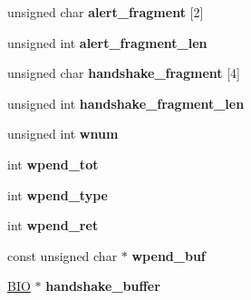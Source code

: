 \begin{DoxyCompactItemize}
\item 
\hypertarget{structssl3__state__st_ac5746677681e98a0ca4e3fb0551dd1df}{}unsigned char {\bfseries alert\+\_\+fragment} \mbox{[}2\mbox{]}\label{structssl3__state__st_ac5746677681e98a0ca4e3fb0551dd1df}

\item 
\hypertarget{structssl3__state__st_aa3a633681eec7c0c4a21564e21f3df8b}{}unsigned int {\bfseries alert\+\_\+fragment\+\_\+len}\label{structssl3__state__st_aa3a633681eec7c0c4a21564e21f3df8b}

\item 
\hypertarget{structssl3__state__st_af9e35d0aec763a8d5e3b4cf618208343}{}unsigned char {\bfseries handshake\+\_\+fragment} \mbox{[}4\mbox{]}\label{structssl3__state__st_af9e35d0aec763a8d5e3b4cf618208343}

\item 
\hypertarget{structssl3__state__st_aa7f770c0190a7c716ff070e3507751d6}{}unsigned int {\bfseries handshake\+\_\+fragment\+\_\+len}\label{structssl3__state__st_aa7f770c0190a7c716ff070e3507751d6}

\item 
\hypertarget{structssl3__state__st_a42c9aa8955edc0d1d23e9a82cff856c5}{}unsigned int {\bfseries wnum}\label{structssl3__state__st_a42c9aa8955edc0d1d23e9a82cff856c5}

\item 
\hypertarget{structssl3__state__st_ab5e408a79cde9fbe60437e28f6294dc5}{}int {\bfseries wpend\+\_\+tot}\label{structssl3__state__st_ab5e408a79cde9fbe60437e28f6294dc5}

\item 
\hypertarget{structssl3__state__st_a9433855d8d8f5ee9e388e8ab942b6306}{}int {\bfseries wpend\+\_\+type}\label{structssl3__state__st_a9433855d8d8f5ee9e388e8ab942b6306}

\item 
\hypertarget{structssl3__state__st_af8b88a29b6ebc467e6754ff6505b7bd0}{}int {\bfseries wpend\+\_\+ret}\label{structssl3__state__st_af8b88a29b6ebc467e6754ff6505b7bd0}

\item 
\hypertarget{structssl3__state__st_a99dc3475625b30f4a59507fd2260ffe3}{}const unsigned char $\ast$ {\bfseries wpend\+\_\+buf}\label{structssl3__state__st_a99dc3475625b30f4a59507fd2260ffe3}

\item 
\hypertarget{structssl3__state__st_a576192e2686348c7b7b1c6cf026f2892}{}\hyperlink{structbio__st}{B\+I\+O} $\ast$ {\bfseries handshake\+\_\+buffer}\label{structssl3__state__st_a576192e2686348c7b7b1c6cf026f2892}


\end{DoxyCompactItemize}
